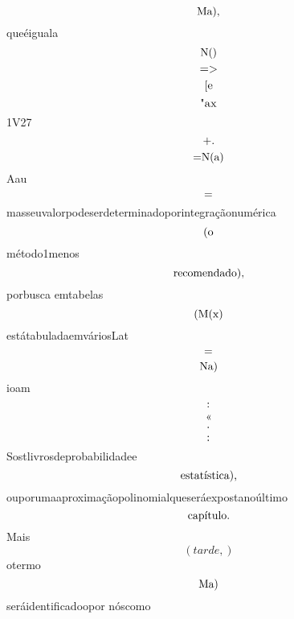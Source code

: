 \documentclass{article}
\begin{document}
\begin{equation}
$Ma),$
\end{equation}queéiguala\begin{equation}
$N()$
\end{equation}\begin{equation}
$=>$
\end{equation}\begin{equation}
$[e$
\end{equation}\begin{equation}
$"ax$
\end{equation}1V27\begin{equation}
$+.$
\end{equation}\begin{equation}
$=N(a)$
\end{equation}Aau\begin{equation}
$=$
\end{equation}masseuvalorpodeserdeterminadoporintegraçãonumérica\begin{equation}
$(o$
\end{equation}método1menos\begin{equation}
$recomendado),$
\end{equation}porbusca emtabelas\begin{equation}
$(M(x)$
\end{equation}estátabuladaemváriosLat\begin{equation}
$=$
\end{equation}\begin{equation}
$Na)$
\end{equation}ioam\begin{equation}
$:$
\end{equation}\begin{equation}
«
\end{equation}\begin{equation}
$.$
\end{equation}\begin{equation}
$:$
\end{equation}Sostlivrosdeprobabilidadee\begin{equation}
$estatística),$
\end{equation}ouporumaaproximaçãopolinomialqueseráexpostanoúltimo\begin{equation}
$capítulo.$
\end{equation}Mais\begin{equation}
\left( tarde,\right)
\end{equation}otermo\begin{equation}
$Ma)$
\end{equation}seráidentificadoopor nóscomo\begin{equation}

\end{equation}
\end{document}

